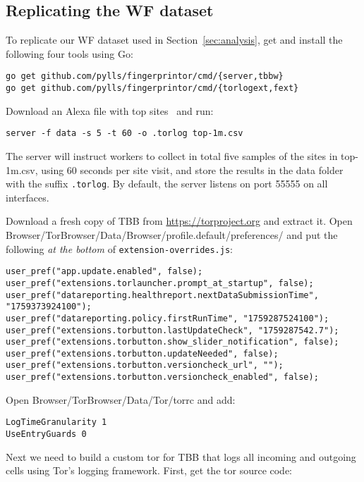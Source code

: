 \subsection{Replicating the WF dataset}
To replicate our WF dataset used in Section~\ref{sec:analysis}, get and
install the following four tools using Go:
\begin{lstlisting}
go get github.com/pylls/fingerprintor/cmd/{server,tbbw}
go get github.com/pylls/fingerprintor/cmd/{torlogext,fext}
\end{lstlisting}

Download an Alexa file with top sites~\cite{alexatop1k} and run:

\begin{lstlisting}
server -f data -s 5 -t 60 -o .torlog top-1m.csv
\end{lstlisting}
The server will instruct workers to collect in total
five samples of the sites in top-1m.csv, using 60 seconds per site visit,
and store the results in the data folder with the suffix \texttt{.torlog}.
By default, the server listens on port 55555 on all interfaces.

Download a fresh copy of TBB from \url{https://torproject.org} and extract it.
Open Browser/TorBrowser/Data/Browser/profile.default/preferences/
and put the
following \emph{at the bottom} of \texttt{extension-overrides.js}:

\begin{lstlisting}
user_pref("app.update.enabled", false);
user_pref("extensions.torlauncher.prompt_at_startup", false);
user_pref("datareporting.healthreport.nextDataSubmissionTime", "1759373924100");
user_pref("datareporting.policy.firstRunTime", "1759287524100");
user_pref("extensions.torbutton.lastUpdateCheck", "1759287542.7");
user_pref("extensions.torbutton.show_slider_notification", false);
user_pref("extensions.torbutton.updateNeeded", false);
user_pref("extensions.torbutton.versioncheck_url", "");
user_pref("extensions.torbutton.versioncheck_enabled", false);
\end{lstlisting}

Open Browser/TorBrowser/Data/Tor/torrc and add:

\begin{lstlisting}
LogTimeGranularity 1
UseEntryGuards 0
\end{lstlisting}

Next we need to build a custom tor for TBB that logs all incoming and outgoing
cells using Tor's logging framework. First, get the tor source code:

